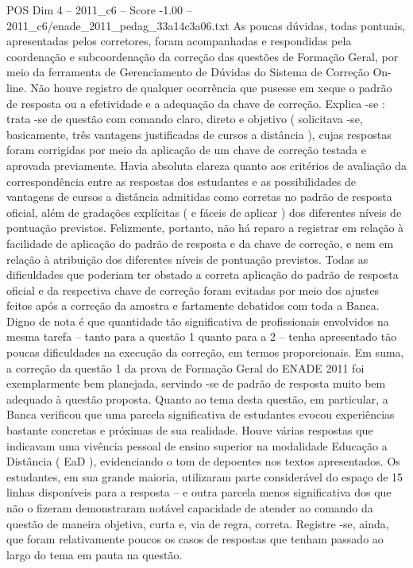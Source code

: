 \begin{textsample}{POS Dim 4 – 2011\_c6 – Score -1.00 – 2011\_c6/enade\_2011\_pedag\_33a14c3a06.txt}
As poucas dúvidas, todas pontuais, apresentadas pelos corretores, foram acompanhadas e respondidas pela coordenação e subcoordenação da correção das questões de Formação Geral, por meio da ferramenta de Gerenciamento de Dúvidas do Sistema de Correção On-line.
Não houve registro de qualquer ocorrência que pusesse em xeque o padrão de resposta ou a efetividade e a adequação da chave de correção.
Explica -se : trata -se de questão com comando claro, direto e objetivo ( solicitava -se, basicamente, três vantagens justificadas de cursos a distância ), cujas respostas foram corrigidas por meio da aplicação de um chave de correção testada e aprovada previamente.
Havia absoluta clareza quanto aos critérios de avaliação da correspondência entre as respostas dos estudantes e as possibilidades de vantagens de cursos a distância admitidas como corretas no padrão de resposta oficial, além de gradações explícitas ( e fáceis de aplicar ) dos diferentes níveis de pontuação previstos.
Felizmente, portanto, não há reparo a registrar em relação à facilidade de aplicação do padrão de resposta e da chave de correção, e nem em relação à atribuição dos diferentes níveis de pontuação previstos.
Todas as dificuldades que poderiam ter obstado a correta aplicação do padrão de resposta oficial e da respectiva chave de correção foram evitadas por meio dos ajustes feitos após a correção da amostra e fartamente debatidos com toda a Banca.
Digno de nota é que quantidade tão significativa de profissionais envolvidos na mesma tarefa – tanto para a questão 1 quanto para a 2 – tenha apresentado tão poucas dificuldades na execução da correção, em termos proporcionais.
Em suma, a correção da questão 1 da prova de Formação Geral do ENADE 2011 foi exemplarmente bem planejada, servindo -se de padrão de resposta muito bem adequado à questão proposta.
Quanto ao tema desta questão, em particular, a Banca verificou que uma parcela significativa de estudantes evocou experiências bastante concretas e próximas de sua realidade.
Houve várias respostas que indicavam uma vivência pessoal de ensino superior na modalidade Educação a Distância ( EaD ), evidenciando o tom de depoentes nos textos apresentados.
Os estudantes, em sua grande maioria, utilizaram parte considerável do espaço de 15 linhas disponíveis para a resposta – e outra parcela menos significativa dos que não o fizeram demonstraram notável capacidade de atender ao comando da questão de maneira objetiva, curta e, via de regra, correta.
Registre -se, ainda, que foram relativamente poucos os casos de respostas que tenham passado ao largo do tema em pauta na questão.

\end{textsample}
